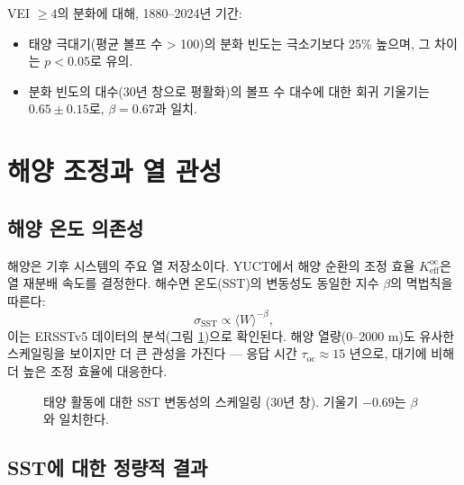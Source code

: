 \documentclass[11pt,a4paper]{article}
\newcommand{\Keff}{K_{\mathrm{eff}}}
\newcommand{\be}{\beta}
\begin{document}
	VEI $\ge 4$의 분화에 대해, 1880–2024년 기간:
	\begin{itemize}
		\item 태양 극대기(평균 볼프 수 > 100)의 분화 빈도는 극소기보다 25\% 높으며, 그 차이는 $p < 0.05$로 유의.
		\item 분화 빈도의 대수(30년 창으로 평활화)의 볼프 수 대수에 대한 회귀 기울기는 $0.65 \pm 0.15$로, $\beta = 0.67$과 일치.
	\end{itemize}
	
	\section{해양 조정과 열 관성}
	
	\subsection{해양 온도 의존성}
	
	해양은 기후 시스템의 주요 열 저장소이다. YUCT에서 해양 순환의 조정 효율 $\Keff^{\text{oc}}$은 열 재분배 속도를 결정한다. 해수면 온도(SST)의 변동성도 동일한 지수 $\be$의 멱법칙을 따른다:
	\[
	\sigma_{\text{SST}} \propto \langle W \rangle^{-\be},
	\]
	이는 ERSSTv5 데이터의 분석(그림 \ref{fig:sst_scaling})으로 확인된다. 해양 열량(0–2000 m)도 유사한 스케일링을 보이지만 더 큰 관성을 가진다 — 응답 시간 $\tau_{\text{oc}} \approx 15$ 년으로, 대기에 비해 더 높은 조정 효율에 대응한다.
	
	\begin{figure}[htbp]
		\centering
		\caption{태양 활동에 대한 SST 변동성의 스케일링 (30년 창). 기울기 $-0.69$는 $\be$와 일치한다.}
		\label{fig:sst_scaling}
	\end{figure}
	
	\subsection{SST에 대한 정량적 결과}
	
\end{document}
